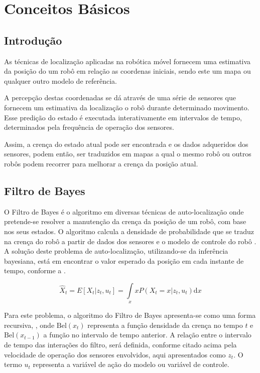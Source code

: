 \chapter{Conceitos Básicos}

 
\section{Introdução}\label{intro::cap3}

As técnicas de localização aplicadas na robótica móvel fornecem uma estimativa da posição do um robô em relação as coordenas iniciais, sendo este um mapa ou qualquer outro modelo de referência.

A percepção destas coordenadas se dá através de uma série de sensores que fornecem um estimativa da localização o robô durante determinado movimento. Esse predição do estado é executada interativamente em intervalos de tempo, determinados pela frequência de operação dos sensores. 

Assim, a crença do estado atual pode ser encontrada e os dados adqueridos dos sensores, podem então, ser traduzidos em mapas a qual o mesmo robô ou outros robôs podem recorrer para melhorar a crença da posição atual.

\section{Filtro de Bayes}

O Filtro de Bayes é o algoritmo em diversas técnicas de auto-localização onde pretende-se resolver a manutenção da crença da posição de um robô, com base nos seus estados. O algoritmo calcula a densidade de probabilidade que se traduz na crença do robô a partir de dados dos sensores e o modelo de controle do robô  \cite{thrun2006probalistic}. A solução deste problema de auto-localização, utilizando-se da inferência bayesiana, está em encontrar o valor esperado da posição em cada instante de tempo, conforme a .

\begin{equation}
    \label{eq:bayes1}
    \hat X_t = E\left[X_t| z_t, u_t\right] = \displaystyle \int\limits_x x P(X_t = x| z_t, u_t)\text{d}x
\end{equation}

Para este problema, o algoritmo do Filtro de Bayes apresenta-se como uma forma recursiva, , onde $\text{Bel}(x_t)$ representa a função densidade da crença no tempo $t$ e $\text{Bel}(x_{t-1})$ a função no intervalo de tempo anterior. A relação entre o intervalo de tempo das interações do filtro, será definida, conforme citado acima pela velocidade de operação dos sensores envolvidos, aqui apresentados como $z_t$. O termo $u_t$ representa a variável de ação do modelo ou variável de controle.


